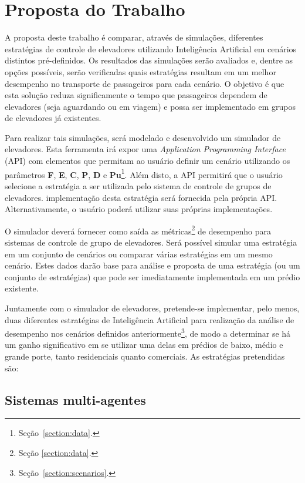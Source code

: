 \chapter{\label{chap:proposal}Proposta do Trabalho}

A proposta deste trabalho é comparar, através de simulações, diferentes
estratégias de controle de elevadores utilizando Inteligência Artificial em
cenários distintos pré-definidos. Os resultados das simulações serão avaliados
e, dentre as opções possíveis, serão verificadas quais estratégias resultam em
um melhor desempenho no transporte de passageiros para cada cenário. O objetivo
é que esta solução reduza significamente o tempo que passageiros dependem de
elevadores (seja aguardando ou em viagem) e possa ser implementado em grupos de
elevadores já existentes.

Para realizar tais simulações, será modelado e desenvolvido um simulador de
elevadores. Esta ferramenta irá expor uma \textit{Application Programming
Interface} (API) com elementos que permitam ao usuário definir um cenário
utilizando os parâmetros \textbf{F}, \textbf{E}, \textbf{C}, \textbf{P},
\textbf{D} e \textbf{Pu}\footnote{Seção~\ref{section:data}.}. Além disto, a API
permitirá que o usuário selecione a estratégia a ser utilizada pelo sistema de
controle de grupos de elevadores. implementação desta estratégia será fornecida
pela própria API. Alternativamente, o usuário poderá utilizar suas próprias
implementações.

O simulador deverá fornecer como saída as métricas\footnote{Seção
\ref{section:data}.} de desempenho para sistemas de controle de grupo de
elevadores. Será possível simular uma estratégia em um conjunto de cenários ou
comparar várias estratégias em um mesmo cenário. Estes dados darão base para
análise e proposta de uma estratégia (ou um conjunto de estratégias) que pode
ser imediatamente implementada em um prédio existente.

Juntamente com o simulador de elevadores, pretende-se implementar, pelo menos,
duas diferentes estratégias de Inteligência Artificial para realização da
análise de desempenho nos cenários definidos
anteriormente\footnote{Seção~\ref{section:scenarios}.}, de modo a determinar se
há um ganho significativo em se utilizar uma delas em prédios de baixo, médio e
grande porte, tanto residenciais quanto comerciais. As estratégias pretendidas
são:

\section{\label{section:multiagentes}Sistemas multi-agentes}

